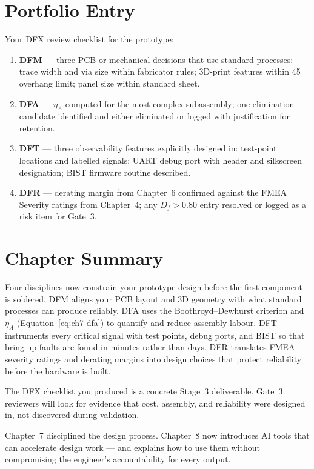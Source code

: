 \section*{Portfolio Entry}
\label{sec:ch7-artifact}

Your DFX review checklist for the prototype:

\begin{enumerate}
  \item \textbf{DFM} --- three PCB or mechanical decisions that use standard
        processes: trace width and via size within fabricator rules; 3D-print
        features within 45\textdegree{} overhang limit; panel size within
        standard sheet.
  \item \textbf{DFA} --- $\eta_A$ computed for the most complex subassembly;
        one elimination candidate identified and either eliminated or logged with
        justification for retention.
  \item \textbf{DFT} --- three observability features explicitly designed in:
        test-point locations and labelled signals; UART debug port with header
        and silkscreen designation; BIST firmware routine described.
  \item \textbf{DFR} --- derating margin from Chapter~6 confirmed against the
        FMEA Severity ratings from Chapter~4; any $D_f > 0.80$ entry resolved or
        logged as a risk item for Gate~3.
\end{enumerate}

\section*{Chapter Summary}
\label{sec:ch7-summary}

Four disciplines now constrain your prototype design before the first component
is soldered.
DFM aligns your PCB layout and 3D geometry with what standard processes can
produce reliably.
DFA uses the Boothroyd--Dewhurst criterion and $\eta_A$ (Equation~\ref{eq:ch7-dfa})
to quantify and reduce assembly labour.
DFT instruments every critical signal with test points, debug ports, and BIST so
that bring-up faults are found in minutes rather than days.
DFR translates FMEA severity ratings and derating margins into design choices
that protect reliability before the hardware is built.

The DFX checklist you produced is a concrete Stage~3 deliverable.
Gate~3 reviewers will look for evidence that cost, assembly, and reliability
were designed in, not discovered during validation.

Chapter~7 disciplined the design process.
Chapter~8 now introduces AI tools that can accelerate design work --- and
explains how to use them without compromising the engineer's accountability
for every output.

